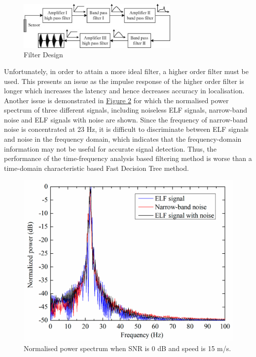 \documentclass[11pt]{article}		%
\newlength{\imageheight}	 %
\newcommand{\figref}[1]{\hyperref[#1]{Figure \ref*{#1}}}    %
\begin{document}
	        \begin{figure}[h]
				\centering
				\includegraphics[width = 0.7\textwidth]{Filtering.jpg}
				\caption{Filter Design} %
				\label{filterDesign}
			\end{figure}
			
			Unfortunately, in order to attain a more ideal filter, a higher order filter must be used.
			This presents an issue as the impulse response of the higher order filter is longer which increases the latency and hence decreases accuracy in localisation. 
			Another issue is demonstrated in \figref{SNRPower} for which the normalised power spectrum of three different signals, including noiseless ELF signals, narrow-band noise and ELF signals with noise are shown. 
			Since the frequency of narrow-band noise is concentrated at 23 Hz, it is difficult to discriminate between ELF signals and noise in the frequency domain, which indicates that the frequency-domain information may not be useful for accurate signal detection. 
			Thus, the performance of the time-frequency analysis based filtering method is worse than a time-domain characteristic based Fast Decision Tree method.
	
	         \begin{figure}[h]
				\centering
				\includegraphics[height=\imageheight]{SNRPower}
				\caption{Normalised power spectrum when SNR is 0 dB and speed is 15 m/s.}
				\label{SNRPower}
			\end{figure}
		    
\end{document}
